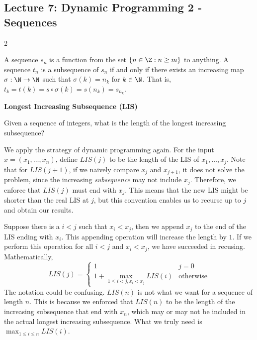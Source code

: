 \subsection{Lecture 7: Dynamic Programming 2 - Sequences}
\begin{multicols}{2}
\begin{definition}[Sequences]
    A sequence $s_n$ is a function from the set $\{n \in \Z : n \geq m\}$ to anything. A sequence $t_n$ is a subsequence of $s_n$ if and only if there exists an increasing map $\sigma : \N \to \N$ such that $\sigma(k) = n_k$ for $k \in \N$. That is, $t_k = t(k) = s\circ \sigma(k) = s(n_k) = s_{n_k}$. 
\end{definition}

\begin{leftbar}
    \textbf{Longest Increasing Subsequence (LIS)}
    
    Given a sequence of integers, what is the length of the longest increasing subsequence?
\end{leftbar}
\begin{analysis}
    We apply the strategy of dynamic programming again. For the input $x = (x_1, \ldots, x_n)$, define $LIS(j)$ to be the length of the LIS of $x_1, \ldots, x_j$. Note that for $LIS(j+1)$, if we naively compare $x_j$ and $x_{j+1}$, it does not solve the problem, since the increasing \textit{subsequence} may not include $x_j$. Therefore, we enforce that $LIS(j)$ must end with $x_j$. This means that the new LIS might be shorter than the real LIS at $j$, but this convention enables us to recurse up to $j$ and obtain our results. 

    Suppose there is a $i < j$ such that $x_i < x_j$, then we append $x_j$ to the end of the LIS ending with $x_i$. This appending operation will increase the length by $1$. If we perform this operation for all $i < j$ and $x_i < x_j$, we have succeeded in recusing. Mathematically, 
    $$
    LIS(j) = 
    \begin{cases}
        1 & j = 0 \\
        1 + \max_{1 \leq i < j, x_i < x_j}LIS(i) & \textrm{otherwise}
    \end{cases}
    $$
    The notation could be confusing. $LIS(n)$ is not what we want for a sequence of length $n$. This is because we enforced that $LIS(n)$ to be the length of the increasing subsequence that end with $x_n$, which may or may not be included in the actual longest increasing subsequence. What we truly need is $\max_{1 \leq i \leq n} LIS(i)$. 


\end{analysis}
\end{multicols}
